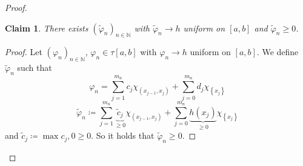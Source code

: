 \documentclass{article}
\newtheorem*{claim}{Claim}%
\newcommand{\set}[1]{\left\{#1\right\}}
\begin{document}
\begin{proof}
\begin{description}
      \begin{claim}
        There exists $(\tilde \varphi_n)_{n\in\mathbb N}$ with $\tilde \varphi_n \to h$ uniform on $[a,b]$
        and $\tilde \varphi_n \geq 0$.
      \end{claim}

      \begin{proof}
        Let $(\varphi_n)_{n\in\mathbb N}$, $\varphi_n \in \tau[a,b]$ with $\varphi_n \to h$ uniform on $[a,b]$.
        We define $\tilde\varphi_n$ such that
        \[ \varphi_n = \sum_{j=1}^{m_n} c_j \chi_{(x_{j-1}, x_j)} + \sum_{j=0}^{m_n} d_j \chi_{\set{x_j}} \]
        \[ \tilde\varphi_n \coloneqq \sum_{j=1}^{m_n} \underbrace{\tilde c_{j}}_{\geq 0} \chi_{(x_{j-1}, x_j)} + \sum_{j=0}^{m_n} \underbrace{h(x_j)}_{\geq 0} \chi_{\set{x_j}} \]
        and $\tilde c_j \coloneqq \max{c_j, 0} \geq 0$.
        So it holds that $\tilde \varphi_n \geq 0$.


\end{proof}
\end{description}
\end{proof}
\end{document}
